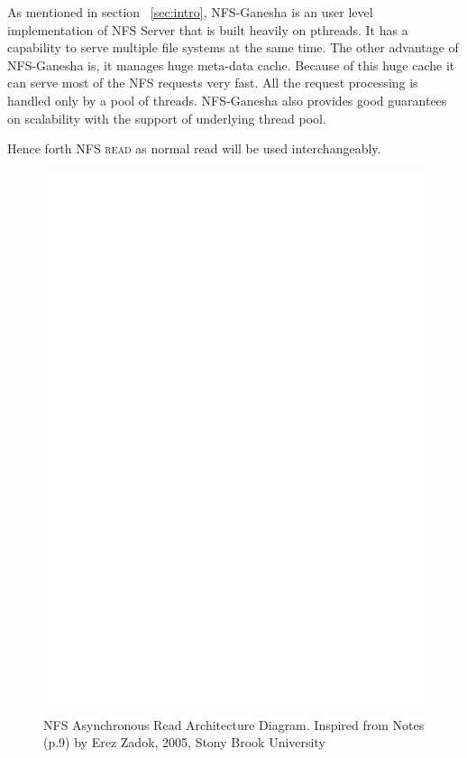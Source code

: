    As mentioned in section ~\ref{sec:intro}, NFS-Ganesha is an user level implementation of NFS Server that is built heavily on pthreads. It has a capability to serve multiple file systems at the same time. The other advantage of NFS-Ganesha is, it manages huge meta-data cache. Because of this huge cache it can serve most of the NFS requests very fast. All the request processing is handled only by a pool of threads. NFS-Ganesha also provides good guarantees on scalability with the support of underlying thread pool. 
   
  Hence forth \textsc{NFS read} as normal read will be used interchangeably.    

\begin{figure}
\centering
\includegraphics[scale=0.7]{figures/AsyncRead.eps}
\caption{NFS Asynchronous Read Architecture Diagram. Inspired from Notes \cite{NFSv4}(p.9) by Erez Zadok, 2005, Stony Brook University}
\label{fig:NFSAsyncReadArch}
\end{figure}



